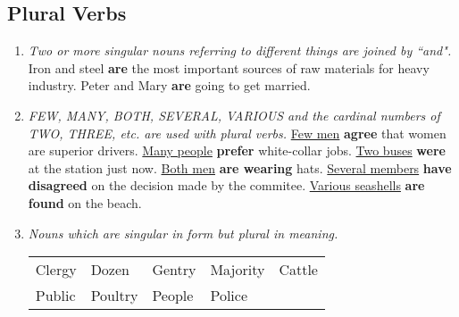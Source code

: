 \subsection{Plural Verbs}
\begin{enumerate}
    \item
        {\it
        Two or more singular nouns referring to different things are joined by
        ``and".
        }
        \newline
        \newline
        Iron and steel \textbf{are} the most important sources of raw materials
        for heavy industry.
        \newline
        \newline
        Peter and Mary \textbf{are} going to get married.
    \item
        {\it
        FEW, MANY, BOTH, SEVERAL, VARIOUS and the cardinal numbers of TWO,
        THREE, etc. are used with plural verbs.
        }
        \newline
        \newline
        \underline{Few men} \textbf{agree} that women are superior drivers.
        \newline
        \newline
        \underline{Many people} \textbf{prefer} white-collar jobs.
        \newline
        \newline
        \underline{Two buses} \textbf{were} at the station just now.
        \newline
        \newline
        \underline{Both men} \textbf{are wearing} hats.
        \newline
        \newline
        \underline{Several members} \textbf{have disagreed} on the decision made
        by the commitee.
        \newline
        \newline
        \underline{Various seashells} \textbf{are found} on the beach.
    \item
        {\it
        Nouns which are singular in form but plural in meaning.
        }
        \newline
        \newline
        \begin{tabular}{lllll}
            Clergy & Dozen & Gentry & Majority & Cattle \\
            Public & Poultry & People & Police
        \end{tabular}

\end{enumerate}

